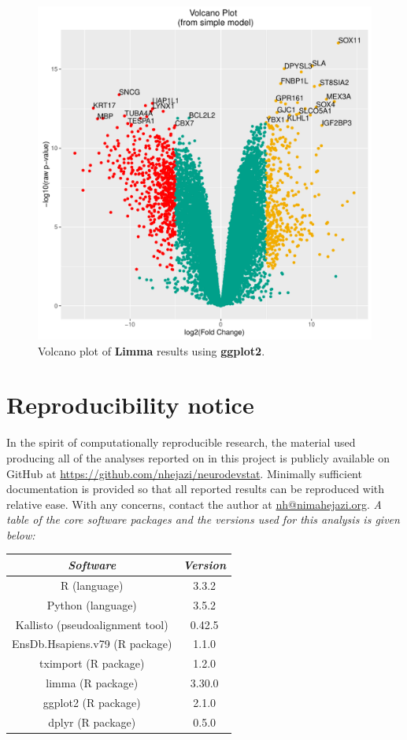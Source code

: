\documentclass[11pt]{article}
\begin{document}
\begin{figure}[H]
\centering
\includegraphics[scale=0.8]{volcano_simplemod_genes.pdf}
\caption{Volcano plot of \textbf{Limma} results using \textbf{ggplot2}.}
\end{figure}


\section{Reproducibility notice}
In the spirit of computationally reproducible research, the material used
producing all of the analyses reported on in this project is publicly available
on GitHub at \url{https://github.com/nhejazi/neurodevstat}. Minimally sufficient
documentation is provided so that all reported results can be reproduced with
relative ease. With any concerns, contact the author at
\href{mailto:nh@nimahejazi.org}{nh@nimahejazi.org}. \textit{A table of the core
software packages and the versions used for this analysis is given below:}

\begin{center}
\begin{tabular}{ |c|c| }
  \hline
  \textit{\textbf{Software}} & \textit{\textbf{Version}} \\
  \hline
  R (language) & 3.3.2 \\
  \hline
  Python (language) & 3.5.2 \\
  \hline
  Kallisto (pseudoalignment tool) & 0.42.5 \\
  \hline
  EnsDb.Hsapiens.v79 (R package) & 1.1.0 \\
  \hline
  tximport (R package) & 1.2.0 \\
  \hline
  limma (R package) & 3.30.0 \\
  \hline
  ggplot2 (R package) & 2.1.0 \\
  \hline
  dplyr (R package) & 0.5.0 \\
  \hline
\end{tabular}
\end{center}
\end{document}
